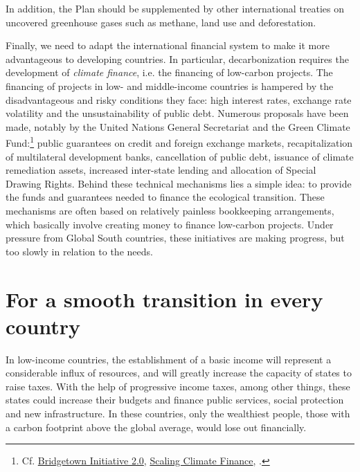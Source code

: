 \documentclass[a5paper,english,openany]{memoir}
\begin{document}
In addition, the Plan should be supplemented by other international treaties on uncovered greenhouse gases such as methane, %
land use and deforestation. 

Finally, we need to adapt the international financial system to make it more advantageous to %
developing countries. In particular, decarbonization %
requires the development of \textit{climate finance}, i.e. the financing of low-carbon projects. The financing of projects in low- and middle-income countries is hampered by the disadvantageous and risky conditions they face: high interest rates, exchange rate volatility and the  unsustainability %
of public debt.  %
Numerous proposals have been made, notably by the United Nations General Secretariat and the Green Climate Fund:\footnote{Cf. \href{https://www.un.org/sustainabledevelopment/blog/2023/04/press-release-with-clock-ticking-for-the-sdgs-un-chief-and-barbados-prime-minister-call-for-urgent-action-to-transform-broken-global-financial-system/}{Bridgetown Initiative 2.0}, \href{https://www.greenclimate.fund/sites/default/files/document/scaling-climate-finance-context-covid-19-full-report\_0.pdf}{Scaling Climate Finance}, \citet{hourcade_accelerating_2021}.} public guarantees on credit and foreign exchange markets, recapitalization of multilateral development banks, cancellation of public debt, issuance of climate remediation assets, increased inter-state lending and allocation of Special Drawing Rights. Behind these technical mechanisms lies a simple idea: to provide the funds and guarantees needed to finance the ecological transition. %
These mechanisms are often based on relatively painless bookkeeping arrangements, which basically involve creating money to finance low-carbon projects. Under pressure from Global South countries, these initiatives are making progress, but %
too slowly in relation to the needs.


\section{For a smooth transition %
in every country}\label{sec:mue_nationale}

In low-income countries, the establishment of a %
basic income will represent a considerable influx of resources, and will greatly increase the capacity of states to raise taxes. With the help of progressive income taxes, among other things, %
these states could increase their budgets and finance public services, social protection and new %
infrastructure. In these countries, only the wealthiest people, those with a carbon footprint above the global average, %
would lose out financially. 
\end{document}
